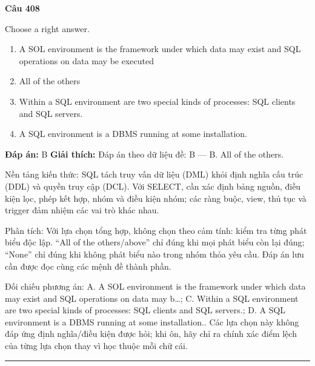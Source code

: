 \documentclass[11pt,a4paper]{article}
\newenvironment{question}[1]{%
  \par\vspace{1em}\noindent\textbf{\large Câu #1}\par\vspace{0.4em}
}{%
  \par\vspace{1em}\hrule\vspace{0.6em}
}
\newenvironment{choices}{%
  \begin{enumerate}[label=\textbf{\Alph*.},leftmargin=2.2em,itemsep=2pt,topsep=3pt]
}{%
  \end{enumerate}
}
\newcommand{\choice}{\item}
\begin{document}
\begin{question}{408}
Choose a right answer.
\begin{choices}
\choice A SOL environment is the framework under which data may exist and SQL operations on data may be executed
\choice All of the others
\choice Within a SQL environment are two special kinds of processes: SQL clients and SQL servers.
\choice A SQL environment is a DBMS running at some installation.
\end{choices}
\textbf{Đáp án:} B
\textbf{Giải thích:} Đáp án theo dữ liệu đề: B — B. All of the others.

Nền tảng kiến thức: SQL tách truy vấn dữ liệu (DML) khỏi định nghĩa cấu trúc (DDL) và quyền truy cập (DCL). Với SELECT, cần xác định bảng nguồn, điều kiện lọc, phép kết hợp, nhóm và điều kiện nhóm; các ràng buộc, view, thủ tục và trigger đảm nhiệm các vai trò khác nhau.

Phân tích: Với lựa chọn tổng hợp, không chọn theo cảm tính: kiểm tra từng phát biểu độc lập. “All of the others/above” chỉ đúng khi mọi phát biểu còn lại đúng; “None” chỉ đúng khi không phát biểu nào trong nhóm thỏa yêu cầu. Đáp án lưu cần được đọc cùng các mệnh đề thành phần.

Đối chiếu phương án: A. A SOL environment is the framework under which data may exist and SQL operations on data may b…; C. Within a SQL environment are two special kinds of processes: SQL clients and SQL servers.; D. A SQL environment is a DBMS running at some installation.. Các lựa chọn này không đáp ứng định nghĩa/điều kiện được hỏi; khi ôn, hãy chỉ ra chính xác điểm lệch của từng lựa chọn thay vì học thuộc mỗi chữ cái.
\end{question}
\end{document}

